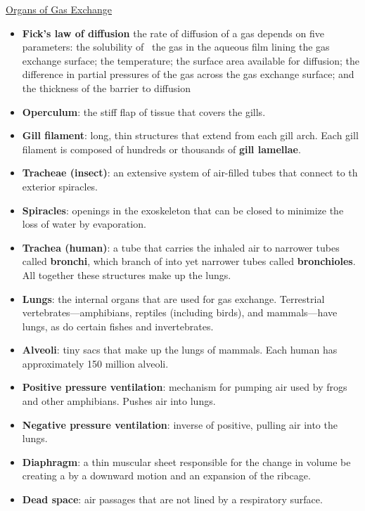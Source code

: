 \documentclass[12pt,letterpaper]{article}
\begin{document}
\hypertarget{42.3}{}
\begin{secbox}{\hyperlink{42}{Organs of Gas Exchange}}{
    \begin{itemize}
        \item \textbf{Fick’s law of diffusion} the rate of diffusion of a gas depends on five parameters: the solubility of  the gas in the aqueous film lining the gas exchange surface; the temperature; the surface area available for diffusion; the difference in partial pressures of the gas across the gas exchange surface; and the thickness of the barrier to diffusion 
        \item \textbf{Operculum}: the stiff flap of tissue that covers the gills.
        \item \textbf{Gill filament}: long, thin structures that extend from each gill arch. Each gill filament is composed of hundreds or thousands of \textbf{gill lamellae}. 
        \item \textbf{Tracheae (insect)}: an extensive system of air-filled tubes that connect to th exterior spiracles.
        \item \textbf{Spiracles}: openings in the exoskeleton that can be closed to minimize the loss of water by evaporation.
        \item \textbf{Trachea (human)}:  a tube that carries the inhaled air to narrower tubes called \textbf{bronchi}, which branch of into yet narrower tubes called \textbf{bronchioles}. All together these structures make up the lungs. 
        \item \textbf{Lungs}: the internal organs that are used for gas exchange. Terrestrial vertebrates—amphibians, reptiles (including birds), and mammals—have lungs, as do certain fishes and invertebrates.
        \item \textbf{Alveoli}: tiny sacs that make up the lungs of mammals. Each human has approximately 150 million alveoli. 
        \item \textbf{Positive pressure ventilation}: mechanism for pumping air used by frogs and other amphibians. Pushes air into lungs.
        \item \textbf{Negative pressure ventilation}: inverse of positive, pulling air into the lungs. 
        \item \textbf{Diaphragm}: a thin muscular sheet responsible for the change in volume be creating a by a downward motion and an expansion of the ribcage. 
        \item \textbf{Dead space}: air passages that are not lined by a respiratory surface.
    \end{itemize}
}\end{secbox}
\end{document}

